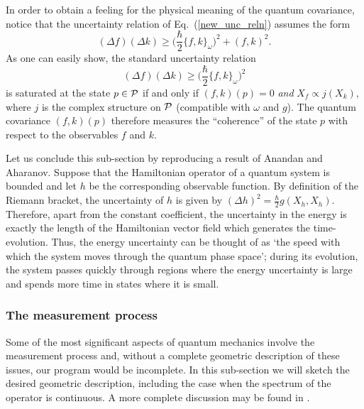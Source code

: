 \documentclass[12pt,aps,eqsecnum,tighten]{revtex4-2}
\def\be{\begin{equation}}
\def\ee{\end{equation}}
\def\P{{\cal P}}
\def\w{\omega}
\newcommand{\eqn}[1]{Eq.~(\ref{#1})}
\newcommand{\hvf}[1]{{X_{#1}}}
\begin{document}
In order to obtain a feeling for the physical meaning of the quantum
covariance, notice that the uncertainty relation of \eqn{new_unc_reln}
assumes the form
%
\be
(\Delta f) (\Delta k) \ge
\bigg( \frac{\hbar}{2} \{ f, k\}_\w \bigg)^2 + ( f, k )^2.
\ee
%
As one can easily show, the standard uncertainty relation
%
\be
(\Delta f) (\Delta k) \ge
\bigg( \frac{\hbar}{2} \{ f, k\}_\w \bigg)^2
\ee
%
is saturated at the state $p \in \P$ if and only if $(f, k)(p) = 0$
{\em and} $\hvf{f} \propto j(\hvf{k})$, where $j$ is the complex
structure on $\P$ (compatible with $\omega$ and $g$).  The quantum
covariance $(f, k)(p)$ therefore measures the ``coherence'' of the
state $p$ with respect to the observables $f$ and $k$.

Let us conclude this sub-section by reproducing a result of Anandan
and Aharanov\cite{anandan}. Suppose that the Hamiltonian operator of a
quantum system is bounded and let $h$ be the corresponding observable
function.  By definition of the Riemann bracket, the uncertainty of
$h$ is given by $(\Delta h)^2 = \frac{\hbar}{2} g(\hvf{h}, \hvf{h})$.
Therefore, apart from the constant coefficient, the uncertainty in the
energy is exactly the length of the Hamiltonian vector field which
generates the time-evolution. Thus, the energy uncertainty can be
thought of as `the speed with which the system moves through the
quantum phase space'; during its evolution, the system passes quickly
through regions where the energy uncertainty is large and spends more
time in states where it is small.


\subsubsection{The measurement process}

Some of the most significant aspects of quantum mechanics involve the
measurement process and, without a complete geometric description of
these issues, our program would be incomplete. In this sub-section we
will sketch the desired geometric description, including the case when
the spectrum of the operator is continuous. A more complete discussion
may be found in \cite{thesis}.
\end{document}
